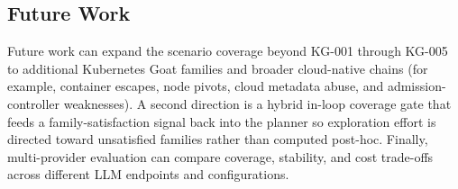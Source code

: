 \documentclass[conference]{IEEEtran}
\begin{document}
\subsection{Future Work}
Future work can expand the scenario coverage beyond KG-001 through KG-005 to additional Kubernetes Goat families and broader cloud-native chains (for example, container escapes, node pivots, cloud metadata abuse, and admission-controller weaknesses). A second direction is a hybrid in-loop coverage gate that feeds a family-satisfaction signal back into the planner so exploration effort is directed toward unsatisfied families rather than computed post-hoc. Finally, multi-provider evaluation can compare coverage, stability, and cost trade-offs across different LLM endpoints and configurations.



\end{document}
